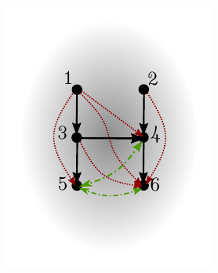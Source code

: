 \documentclass[12pt]{article}
\begin{document}
\begin{example}
\begin{figure}
    \begin{subfigure}[b]{0.45\textwidth}
      \includegraphics[width=\linewidth]{example_algorithm.pdf}
    \end{subfigure}
    \begin{subfigure}[b]{0.45\textwidth}

\end{subfigure}
\end{figure}
\end{example}
\end{document}
